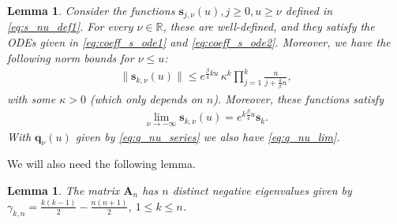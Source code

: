 \documentclass[12pt]{article}
\newtheorem{lemma}[theorem]{Lemma}
\theoremstyle{definition} %
\newcommand{\R}{{\mathbb R}}
\theoremstyle{remark} %
\begin{document}
\begin{lemma}\label{lem:coeff_s} Consider the functions $ \mathbf{s}_{j,\nu}(u), j\ge 0, u\ge \nu$ defined in \eqref{eq:s_nu_def1}. For every $\nu\in \R$, these are well-defined, and they satisfy the  ODEs given in \eqref{eq:coeff_s_ode1} and   \eqref{eq:coeff_s_ode2}. Moreover, we have the following norm bounds for $\nu\le u$:
\begin{align}\label{eq:coeff_norm_bound}
        \|\mathbf{s}_{k,\nu}(u)\|\le e^{\frac{\beta}{4} k u} \,  \kappa^k \prod_{j=1}^k\frac{n}{j+\frac{4}{\beta}n},
\end{align}
with some $\kappa>0$ (which only depends on $n$). 
Moreover, these functions satisfy 
\begin{align}\label{eq:coeff_nu_lim}
    \lim\limits_{\nu\to -\infty} \mathbf{s}_{k,\nu}(u)=e^{k \frac{\beta}{4}u} \mathbf{s}_{k}.
\end{align}
With $\mathbf{q}_{\nu}(u)$ given by \eqref{eq:q_nu_series} we also have \eqref{eq:q_nu_lim}.
\end{lemma}
We will also need the following lemma.
\begin{lemma}\label{lem:An_eval}
The matrix $\mathbf{A}_n$ has  $n$ distinct  negative eigenvalues given by  $\gamma_{k,n}=\frac{k(k-1)}{2}-\frac{n(n+1)}{2}$, $1\le k\le n$. 
\end{lemma}
\end{document}
